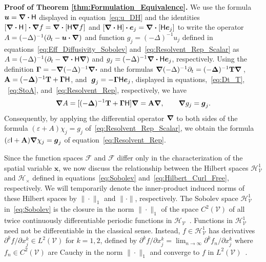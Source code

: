 \documentclass[leqno,onefignum,onetabnum]{siamltex1213}
\newcommand{\Tb}{\mathbf{T}}
\newcommand{\Ab}{\mathbf{A}}
\newcommand{\Vc}{\mathcal{V}}
\newcommand{\Hc}{\mathcal{H}}
\newcommand{\Fc}{\mathcal{F}}
\newcommand{\Hm}{\mathsf{H}}
\newcommand{\Ib}{\mathsf{I}}
\newcommand{\Hs}{\mathscr{H}}
\newcommand{\Fs}{\mathscr{F}}
\newcommand\bDelta{\mbox{\boldmath${\Delta}$}}
\newcommand\bGamma{\mbox{\boldmath${\Gamma}$}}
\newcommand\bnabla{\mbox{\boldmath${\nabla}$}}
\providecommand\bcdot{\boldsymbol{\cdot}}
\newcommand{\vecg}{\boldsymbol{g}}
\newcommand{\vecx}{\boldsymbol{x}}
\newcommand{\vecu}{\boldsymbol{u}}
\newcommand{\vece}{\boldsymbol{e}}
\begin{document}
\textbf{Proof of Theorem \ref{thm:Formulation_Equivalence}.}\hspace{1ex}
%
We use the formula $\vecu =\bnabla \bcdot\Hm$ displayed in
equation~\eqref{eq:u_DH} and the identities
$[\bnabla\bcdot\Hm\,]\bcdot\bnabla f=\bnabla\bcdot[\Hm\bnabla f]$
and $[\bnabla\bcdot\Hm]\bcdot\vece_j=\bnabla\bcdot[\Hm\vece_j]$ to 
write the operator $A=(-\Delta)^{-1}(\partial_t-\vecu\bcdot\bnabla)$ and function
$g_j=(-\Delta)^{-1}u_j$ defined in 
equations~\eqref{eq:Eff_Diffusivity_Sobolev}
and~\eqref{eq:Resolvent_Rep_Scalar} 
as $A=(-\Delta)^{-1}(\partial_t-\bnabla \bcdot\Hm\bnabla)$ and
$g_j=(-\Delta)^{-1}\bnabla \bcdot\Hm\vece _j$, respectively. Using the
definition $\bGamma=-\bnabla (-\Delta)^{-1}\bnabla \bcdot$ and the formulas 
$\bnabla(-\Delta)^{-1}\partial_t=(-\bDelta)^{-1}\Tb\bnabla \,$,
$\Ab=(-\bDelta)^{-1}\Tb+\bGamma\Hm$, and 
$\;\vecg_j=-\bGamma\Hm\vece _j$, 
displayed in equations,~\eqref{eq:Dt_T}, ~\eqref{eq:StoA},
and~\eqref{eq:Resolvent_Rep}, respectively, we have  
%
\begin{align}\label{eq:A_Ab_Relation}
  \bnabla A=[(-\bDelta)^{-1}\Tb+\bGamma\Hm]\bnabla =\Ab\bnabla , \qquad
  \bnabla g_j=\vecg_j.
\end{align}
%
Consequently, by applying the
differential operator $\bnabla $ to both sides of the formula
$(\varepsilon+A)\chi_j=g_j$ of~\eqref{eq:Resolvent_Rep_Scalar}, we obtain the
formula  $(\varepsilon\Ib+\Ab)\bnabla \chi_j=\vecg_j$ of
equation~\eqref{eq:Resolvent_Rep}. 



Since the function spaces $\Fs$ and $\Fc$ differ only in the
characterization of the spatial variable $\vecx$, we now discuss the
relationship between the Hilbert spaces $\Hs^1_{\Vc}$ and $\Hc_\times$
defined in equations~\eqref{eq:Sobolev}
and~\eqref{eq:Hilbert_Curl_Free}, respectively. We will temporarily
denote the inner-product induced norms of these Hilbert spaces by
$\|\cdot\|_1$ and $\|\cdot\|$, respectively. The Sobolev space $\Hs^1_{\Vc}$
in~\eqref{eq:Sobolev} is the closure in the norm $\|\cdot\|_1$ of the space
$C^2(\Vc)$ of all twice continuously differentiable periodic functions
in $\Hs_{\Vc}$~\cite{Bhattacharya:AAP:1999:951}. Functions in
$\Hs^1_{\Vc}$ need not be differentiable in the classical
sense. Instead, $f\in\Hs^1_{\Vc}$ has derivatives $\partial^kf/\partial x_j^k\in
L^2(\Vc)$ for $k=1,2$, defined by
$\partial^kf/\partial x_j^k=\lim_{n\to\infty}\partial^kf_n/\partial x_j^k$ where $f_n\in C^2(\Vc)$ are
Cauchy in the norm $\|\cdot\|_1$ and converge to $f$ in
$L^2(\Vc)$~\cite{McOwen:2003:PDE}. 
\end{document}
